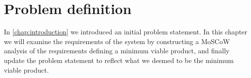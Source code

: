 \chapter{Problem definition}
In \autoref{chap:introduction} we introduced an initial problem statement.
In this chapter we will examine the requirements of the system by constructing a MoSCoW analysis of the requirements defining a minimum viable product, and finally update the problem statement to reflect what we deemed to be the minimum viable product.


